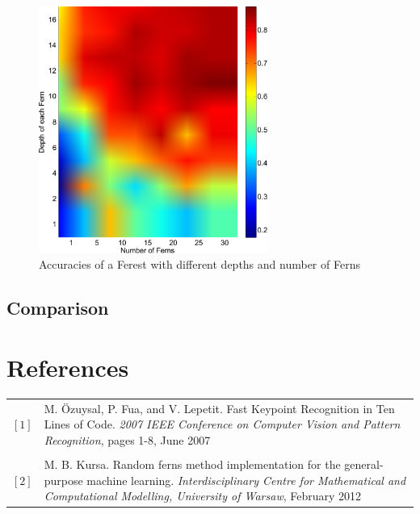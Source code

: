 \documentclass[twocolumn]{article}
\begin{document}
\begin{figure}[h] 
\centering
\hspace{-8mm} 
\includegraphics[width=7.5cm]{Diagrams/heatmap_randFerns_16_30}
\caption{Accuracies of a Ferest with different depths and number of Ferns}
\label{ferest_heatmap}
\end{figure}

\subsection{Comparison}


\onecolumn
\section*{References}

\begin{tabular}{p{1cm}p{11cm}}

$[1]$ & M. \"Ozuysal, P. Fua, and V. Lepetit. Fast Keypoint Recognition in Ten Lines of Code. \textit{2007 IEEE Conference on Computer Vision and Pattern Recognition}, pages 1-8, June 2007\\
 & \\
$[2]$ & M. B. Kursa. Random ferns method implementation for the general-purpose machine learning. \textit{Interdisciplinary Centre for Mathematical and Computational Modelling, University of Warsaw}, February 2012

\end{tabular}
\end{document}
